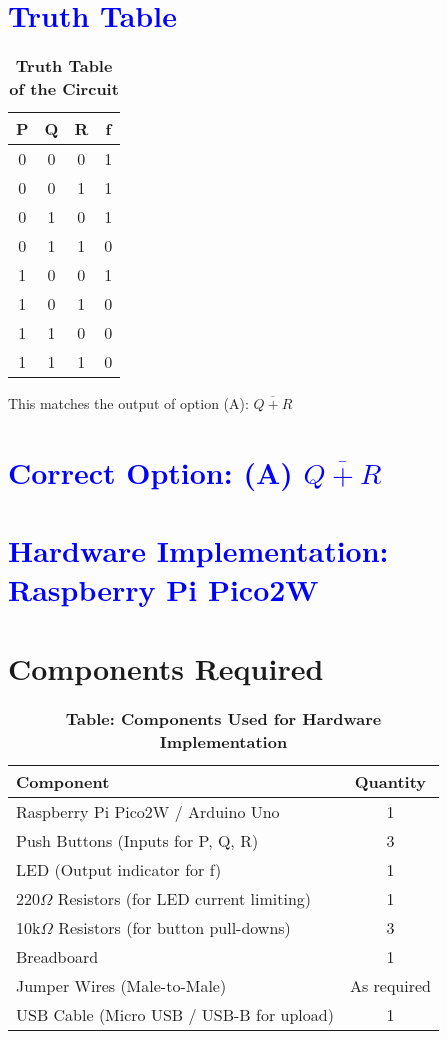 \documentclass[twocolumn]{article}
\begin{document}
\section*{\textcolor{blue}{Truth Table}}

\begin{table}[h]
\centering
\renewcommand{\arraystretch}{1.2}
\begin{tabular}{|c|c|c|c|}
\hline
P & Q & R & f \\
\hline
0 & 0 & 0 & 1 \\
0 & 0 & 1 & 1 \\
0 & 1 & 0 & 1 \\
0 & 1 & 1 & 0 \\
1 & 0 & 0 & 1 \\
1 & 0 & 1 & 0 \\
1 & 1 & 0 & 0 \\
1 & 1 & 1 & 0 \\
\hline
\end{tabular}
\caption*{\textbf{Truth Table of the Circuit}}
\end{table}

This matches the output of option (A): $\overline{Q + R}$

\section*{\textcolor{blue}{Correct Option: (A) $\overline{Q + R}$}}

\section*{\textcolor{blue}{Hardware Implementation: Raspberry Pi Pico2W}}
\section*{{Components Required}}

\begin{table}[h]
\centering
\renewcommand{\arraystretch}{1.2}
\begin{tabular}{|>{\raggedright}p{5cm}|c|}
\hline
\textbf{Component} & \textbf{Quantity} \\
\hline
Raspberry Pi Pico2W / Arduino Uno & 1 \\
Push Buttons (Inputs for P, Q, R) & 3 \\
LED (Output indicator for f) & 1 \\
220$\Omega$ Resistors (for LED current limiting) & 1 \\
10k$\Omega$ Resistors (for button pull-downs) & 3 \\
Breadboard & 1 \\
Jumper Wires (Male-to-Male) & As required \\
USB Cable (Micro USB / USB-B for upload) & 1 \\
\hline
\end{tabular}
\caption*{\textbf{Table: Components Used for Hardware Implementation}}
\end{table}
\end{document}
